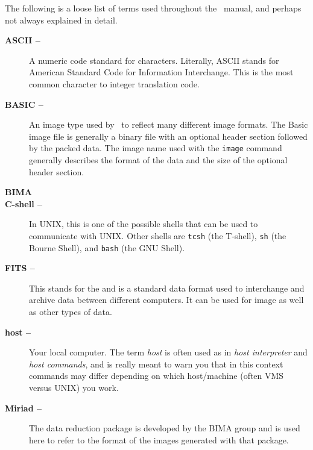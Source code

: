 %
%

The following is a loose list of terms used throughout the \wip\ manual,
and perhaps not always explained in detail.

\begin{description}
  \item[{\bf ASCII --}] A numeric code standard for characters.
    Literally, ASCII stands for American Standard Code
    for Information Interchange.
    This is the most common character to integer translation code.
  \item[{\bf BASIC --}] An
    image type used by \wip\ to reflect many different image formats.
    The Basic image file is generally a binary file with an optional
    header section followed by the packed data.
    The image name used with the {\tt image}%
     command generally describes
    the format of the data and the size of the optional header section.
  \item[{\bf BIMA}] 
  \item[{\bf C-shell --}] In UNIX, this is one of the
    possible shells that can be used to communicate with UNIX.
    Other shells are {\tt tcsh} (the T-shell), {\tt sh} (the Bourne Shell),
    and {\tt bash} (the GNU Shell).
  \item[{\bf FITS --}]
    This stands for the
    and is a standard data format used to interchange and archive data
    between different computers.
    It can be used for image as well as other types of data.
  \item[{\bf host --}] Your local computer.
    The term {\it host} is often used as in 
    {\it host interpreter} and {\it host commands}, and is really meant to
    warn you that in this context commands may differ depending on which
    host/machine (often VMS versus UNIX) you work.
  \item[{\bf Miriad --}]
    The 
    data reduction package is developed by the BIMA group and is used
    here to refer to the format of the images generated with that package.

\end{description}
